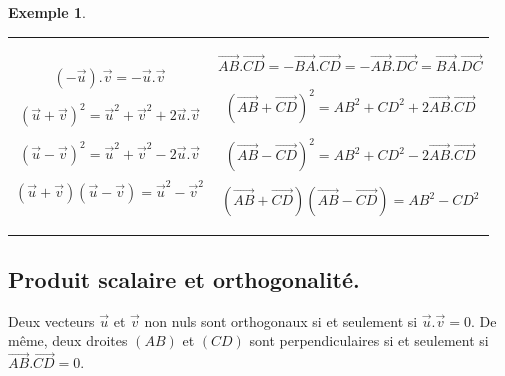 \documentclass[a4paper,11pt]{article}
\theoremstyle{break}
\newcounter{enonce}
\newtheorem{exemple}[enonce]{Exemple}
\begin{document}
   
  \begin{exemple}

  \vspace{0.5cm}~
  
  \begin{tabular}{c c}
  \begin{minipage}[b]{0.47\textwidth}

 $(-\vec{u}).\vec{v}=-\vec{u}.\vec{v}$
 
 $(\vec{u}+\vec{v})^2=\vec{u}^2+\vec{v}^2+2\vec{u}.\vec{v}$
 
 $(\vec{u}-\vec{v})^2=\vec{u}^2+\vec{v}^2-2\vec{u}.\vec{v}$
 
 $(\vec{u}+\vec{v})(\vec{u}-\vec{v})=\vec{u}^2-\vec{v}^2$

  \end{minipage}
&
  \begin{minipage}[b]{0.47\textwidth}
   
 
 $\vec{AB}.\vec{CD}=-\vec{BA}.\vec{CD}=-\vec{AB}.\vec{DC}=\vec{BA}.\vec{DC}$
 
  $(\vec{AB}+\vec{CD})^2=AB^2+CD^2+2\vec{AB}.\vec{CD}$
  
  $(\vec{AB}-\vec{CD})^2=AB^2+CD^2-2\vec{AB}.\vec{CD}$
  
  $(\vec{AB}+\vec{CD})(\vec{AB}-\vec{CD})=AB^2-CD^2$


  \end{minipage}

  \end{tabular}

  \end{exemple}

\subsection{Produit scalaire et orthogonalité.} 

\begin{theorem}

 Deux vecteurs $\vec{u}$ et $\vec{v}$ non nuls sont orthogonaux si et seulement si $\vec{u}.\vec{v}=0$. De même, deux droites $(AB)$ et $(CD)$ sont perpendiculaires si et seulement si $\vec{AB}.\vec{CD}=0$.
\end{theorem}
\end{document}
